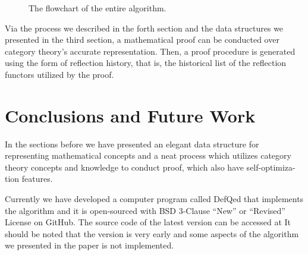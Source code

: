 \documentclass{aims}
\numberwithin{theorem}{section}	%
\numberwithin{axiom}{section}	%
\numberwithin{definition}{section}	%
\begin{document}
\begin{figure}[h!t]
	\caption{The flowchart of the entire algorithm.}
	\label{figure-3}
\end{figure}

Via the process we described in the forth section and the data structures we presented in the third section, a mathematical proof can be conducted over category theory{'}s accurate representation. Then, a proof procedure is generated using the form of reflection history, that is, the historical list of the reflection functors utilized by the proof.

\section{Conclusions and Future Work}

In the sections before we have presented an elegant data structure for representing mathematical concepts and a neat process which utilizes category theory concepts and knowledge to conduct proof, which also have self-optimiza-tion features.

Currently we have developed a computer program called DefQed that implements the algorithm and it is open-sourced with BSD 3-Clause {``}New{''} or {``}Revised{''} License on GitHub. The source code of the latest version can be accessed at \cite{Wang2022} It should be noted that the version is very early and some aspects of the algorithm we presented in the paper is not implemented.
\end{document}
